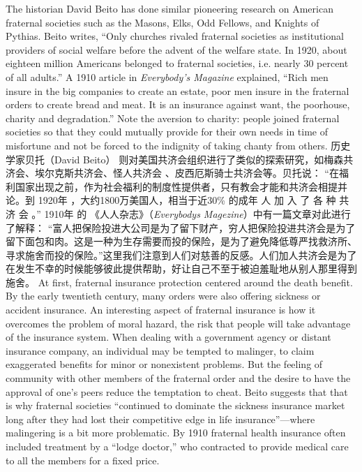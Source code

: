 \begin{paracol}{2}
\switchcolumn*
The historian David Beito has done similar pioneering research on American fraternal societies such as the Masons, Elks,
Odd Fellows, and Knights of Pythias. Beito writes, ``Only
churches rivaled fraternal societies as institutional providers of
social welfare before the advent of the welfare state. In 1920,
about eighteen million Americans belonged to fraternal societies, i.e. nearly 30 percent of all adults.'' A 1910 article in
\textit{Everybody's Magazine} explained, ``Rich men insure in the big
companies to create an estate, poor men insure in the fraternal
orders to create bread and meat. It is an insurance against want,
the poorhouse, charity and degradation.'' Note the aversion to
charity: people joined fraternal societies so that they could mutually provide for their own needs in time of misfortune and not
be forced to the indignity of taking chanty from others.
\switchcolumn
历史学家贝托（David Beito） 则对美国共济会组织进行了类似的探索研究，如梅森共济会、埃尔克斯共济会、怪人共济会 、皮西厄斯骑士共济会等。贝托说： “在福利国家出现之前，作为社会福利的制度性提供者，只有教会才能和共济会相提并论。到 1920年 ，大约1800万美国人，相当于近30\% 的成年 人 加 入 了 各 种 共 济 会 。” 1910年 的 《人人杂志》（\textit{Everybodys Magezine}）中有一篇文章对此进行了解释： “富人把保险投进大公司是为了留下财产，穷人把保险投进共济会是为了留下面包和肉。这是一种为生存需要而投的保险，是为了避免降低尊严找救济所、寻求施舍而投的保险。”这里我们注意到人们对慈善的反感。人们加人共济会是为了在发生不幸的时候能够彼此提供帮助，好让自己不至于被迫羞耻地从别人那里得到施舍。
\switchcolumn*
At first, fraternal insurance protection centered around the
death benefit. By the early twentieth century, many orders were
also offering sickness or accident insurance. An interesting aspect of fraternal insurance is how it overcomes the problem of
moral hazard, the risk that people will take advantage of the insurance system. When dealing with a government agency or
distant insurance company, an individual may be tempted to
malinger, to claim exaggerated benefits for minor or nonexistent problems. But the feeling of community with other members of the fraternal order and the desire to have the approval of
one's peers reduce the temptation to cheat. Beito suggests that
that is why fraternal societies ``continued to dominate the sickness insurance market long after they had lost their competitive
edge in life insurance''---where malingering is a bit more problematic. By 1910 fraternal health insurance often included
treatment by a ``lodge doctor,'' who contracted to provide medical care to all the members for a fixed price.

\end{paracol}
